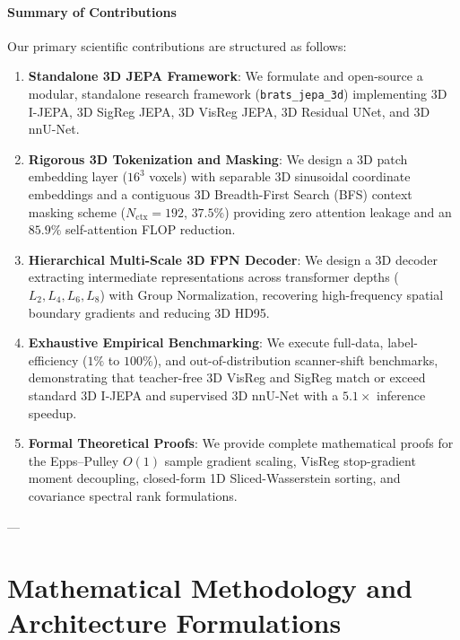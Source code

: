 \documentclass{article}
\begin{document}
\paragraph{Summary of Contributions}
Our primary scientific contributions are structured as follows:
\begin{enumerate}
    \item \textbf{Standalone 3D JEPA Framework}: We formulate and open-source a modular, standalone research framework (\texttt{brats\_jepa\_3d}) implementing 3D I-JEPA, 3D SigReg JEPA, 3D VisReg JEPA, 3D Residual UNet, and 3D nnU-Net.
    \item \textbf{Rigorous 3D Tokenization and Masking}: We design a 3D patch embedding layer ($16^3$ voxels) with separable 3D sinusoidal coordinate embeddings and a contiguous 3D Breadth-First Search (BFS) context masking scheme ($N_{\text{ctx}} = 192$, $37.5\%$) providing zero attention leakage and an $85.9\%$ self-attention FLOP reduction.
    \item \textbf{Hierarchical Multi-Scale 3D FPN Decoder}: We design a 3D decoder extracting intermediate representations across transformer depths ($L_2, L_4, L_6, L_8$) with Group Normalization, recovering high-frequency spatial boundary gradients and reducing 3D HD95.
    \item \textbf{Exhaustive Empirical Benchmarking}: We execute full-data, label-efficiency ($1\%$ to $100\%$), and out-of-distribution scanner-shift benchmarks, demonstrating that teacher-free 3D VisReg and SigReg match or exceed standard 3D I-JEPA and supervised 3D nnU-Net with a $5.1\times$ inference speedup.
    \item \textbf{Formal Theoretical Proofs}: We provide complete mathematical proofs for the Epps--Pulley $O(1)$ sample gradient scaling, VisReg stop-gradient moment decoupling, closed-form 1D Sliced-Wasserstein sorting, and covariance spectral rank formulations.
\end{enumerate}

---

\section{Mathematical Methodology and Architecture Formulations}
\end{document}
